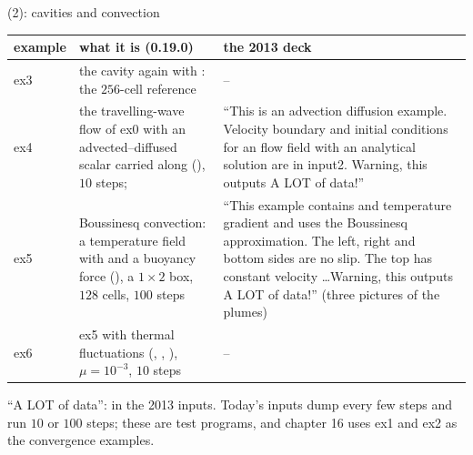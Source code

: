 \documentclass[aspectratio=169,11pt]{beamer}
\begin{document}
\begin{frame}{ (2): cavities and convection}
\label{fr:ns2}
\scriptsize
\setlength{\tabcolsep}{3pt}
\begin{tabular}{@{}lL{0.5\textwidth}L{0.38\textwidth}@{}}
\toprule
example & what it is (0.19.0) & the 2013 deck\\
\midrule
ex3 & the cavity again with : the $256$-cell reference & --\\
ex4 & the travelling-wave flow of ex0 with an advected--diffused scalar carried along (), $10$ steps;  & ``This is an advection diffusion example. Velocity boundary and initial conditions for an flow field with an analytical solution are in input2. Warning, this outputs A LOT of data!''\\
ex5 & Boussinesq convection: a temperature field with  and a buoyancy force  (), a $1\times2$ box, $128$ cells, $100$ steps & ``This example contains and temperature gradient and uses the Boussinesq approximation. The left, right and bottom sides are no slip. The top has constant velocity \ldots Warning, this outputs A LOT of data!'' (three pictures of the plumes)\\
ex6 & ex5 with thermal fluctuations (, , ), $\mu = 10^{-3}$, $10$ steps & --\\
\bottomrule
\end{tabular}
\vspace{1mm}

\scriptsize ``A LOT of data'':  in the 2013 inputs. Today's inputs dump every few steps and run $10$ or $100$ steps; these are test programs, and chapter 16 uses ex1 and ex2 as the convergence examples.
\end{frame}
\end{document}
